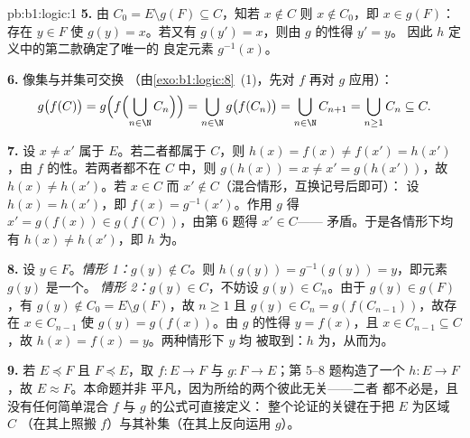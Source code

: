 \begin{solution}{pb:b1:logic:1}
\textbf{5.} 由 $C_0 = E \setminus g(F) \subseteq C$，知若 $x \notin C$
则 $x \notin C_0$，即 $x \in g(F)$：存在 $y \in F$ 使
$g(y) = x$。若又有 $g(y') = x$，则由 $g$ 的性得 $y' = y$。
因此 $h$ 定义中的第二款确定了唯一的
良定元素 $g^{-1}(x)$。

\textbf{6.} 像集与并集可交换
（由\cref{exo:b1:logic:8}~(1)，先对 $f$ 再对 $g$ 应用）：
\[
g\bigl(f(C)\bigr)
= g\Bigl(f\Bigl(\bigcup_{n \in \N} C_n\Bigr)\Bigr)
= \bigcup_{n \in \N} g\bigl(f(C_n)\bigr)
= \bigcup_{n \in \N} C_{n+1}
= \bigcup_{n \geq 1} C_n \subseteq C .
\]

\textbf{7.} 设 $x \neq x'$ 属于 $E$。若二者都属于 $C$，则 $h(x) =
f(x) \neq f(x') = h(x')$，由 $f$ 的性。若两者都不在
$C$ 中，则 $g(h(x)) = x \neq x' = g(h(x'))$，故 $h(x) \neq h(x')$。若
$x \in C$ 而 $x' \notin C$（混合情形，互换记号后即可）：
设 $h(x) = h(x')$，即 $f(x) = g^{-1}(x')$。作用 $g$ 得
$x' = g(f(x)) \in g(f(C))$，由第 6 题得 $x' \in C$——
矛盾。于是各情形下均有 $h(x) \neq h(x')$，即 $h$ 为。

\textbf{8.} 设 $y \in F$。\emph{情形 1：$g(y) \notin C$。}则
$h(g(y)) = g^{-1}(g(y)) = y$，即元素 $g(y)$ 是一个。
\emph{情形 2：$g(y) \in C$}，不妨设 $g(y) \in C_n$。由于 $g(y) \in
g(F)$，有 $g(y) \notin C_0 = E \setminus g(F)$，故 $n \geq 1$
且 $g(y) \in C_n = g(f(C_{n-1}))$，故存在 $x \in C_{n-1}$ 使
$g(y) = g(f(x))$。由 $g$ 的性得 $y = f(x)$，且 $x \in
C_{n-1} \subseteq C$，故 $h(x) = f(x) = y$。两种情形下 $y$ 均
被取到：$h$ 为，从而为。

\textbf{9.} 若 $E \preceq F$ 且 $F \preceq E$，取 $f
\colon E \to F$ 与 $g \colon F \to E$；第 5--8 题构造了一个
 $h \colon E \to F$，故 $E \approx F$。本命题并非
平凡，因为所给的两个彼此无关——二者
都不必是，且没有任何简单混合 $f$ 与 $g$ 的公式可直接定义：
整个论证的关键在于把 $E$ 为区域 $C$
（在其上照搬 $f$）与其补集（在其上反向运用
$g$）。


\end{solution}
